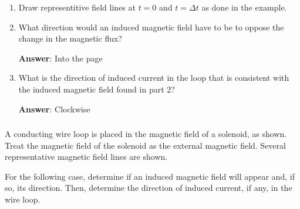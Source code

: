\documentclass{article}
\begin{document}


\begin{enumerate}

  \item Draw representitive field lines at $t=0$ and $t=\Delta t$ as done in the example.

        \ifsolutions

        \else

        
        \fi

  \item What direction would an induced magnetic field have to be to oppose the change in the magnetic flux?

        \ifsolutions
        {\bf Answer}: Into the page
        \else

        \fi

  \item What is the direction of induced current in the loop that is consistent with the induced magnetic field found in part 2?

        \ifsolutions
        {\bf Answer}: Clockwise
        \else

        \fi

\end{enumerate}

\subsubsection{}

A conducting wire loop is placed in the magnetic field of a solenoid, as shown. Treat the magnetic field of the solenoid as the external magnetic field. Several representative magnetic field lines are shown.



For the following case, determine if an induced magnetic field will appear and, if so, its direction. Then, determine the direction of induced current, if any, in the wire loop.
\end{document}
